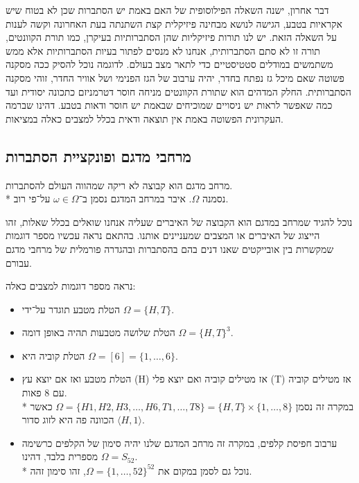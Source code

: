 דבר אחרון, ישנה השאלה הפילוסופית של האם באמת יש הסתברות שכן לא בטוח שיש אקראיות בטבע, הגישה לנושא מבחינה פיזיקלית קצת השתנתה בעת האחרונה וקשה לענות על השאלה הזאת.
יש לנו תורות פיזיקליות שהן הסתברותיות בעיקרן, כמו תורת הקוונטים, תורה זו לא סתם הסתברותית, אנחנו לא מנסים לפתור בעיות הסתברותיות אלא ממש משתמשים במודלים סטטיסטיים כדי לתאר מצב בעולם.
לדוגמה נוכל להסיק ככה מסקנה פשוטה שאם מיכל גז נפתח בחדר, יהיה ערבוב של הגז הפנימי ושל אוויר החדר, זוהי מסקנה הסתברותית.
החלק המדהים הוא שתורת הקוונטים מניחה חוסר דטרמניזם כתכונה יסודית ועד כמה שאפשר לראות יש ניסויים שמוכיחים שבאמת יש חוסר ודאות בטבע.
דהינו שברמה העקרונית הפשוטה באמת אין תוצאה ודאית בכלל למצבים כאלה במציאות.

\subsection{מרחבי מדגם ופונקציית הסתברות}
\begin{definition}
	מרחב מדגם הוא קבוצה לא ריקה שמהווה העולם להסתברות. \\*
	נסמנה $\Omega$.
	איבר במרחב המדגם נסמן ב־$\omega \in \Omega$ על־פי רוב.
\end{definition}
נוכל להגיד שמרחב במדגם הוא הקבוצה של האיברים שעליה אנחנו שואלים בכלל שאלות, זהו הייצוג של האיברים או המצבים שמעניינים אותנו.
בהתאם נראה עכשיו מספר דוגמות שמקשרות בין אובייקטים שאנו דנים בהם בהסתברות ובהגדרה פורמלית של מרחבי מדגם עבורם.
\begin{example}
	נראה מספר דוגמות למצבים כאלה:
	\begin{itemize}
		\item הטלת מטבע תוגדר על־ידי $\Omega = \{ H, T \}$.
		\item הטלת שלושה מטבעות תהיה באופן דומה $\Omega = {\{H, T\}}^3$.
		\item הטלת קוביה היא $\Omega = [6] = \{ 1, \dots, 6 \}$.
		\item הטלת מטבע ואז אם יוצא עץ (H) אז מטילים קוביה ואם יוצא פלי (T) אז מטילים קוביה עם 8 פאות. \\*
			במקרה זה נסמן $\Omega = \{ H1, H2, H3, \dots, H6, T1, \dots, T8 \} = \{H, T \} \times \{1, \dots, 8 \}$ כאשר הכוונה פה היא לזוג סדור $\langle H, 1 \rangle$.
		\item ערבוב חפיסת קלפים, במקרה זה מרחב המדגם שלנו יהיה סימון של הקלפים כרשימה מספרית בלבד, דהינו $\Omega = S_{52}$. \\*
			נוכל גם לסמן במקום את $\Omega = {\{1, \dots, 52 \}}^{52}$, זהו סימון זהה.
	\end{itemize}
\end{example}
